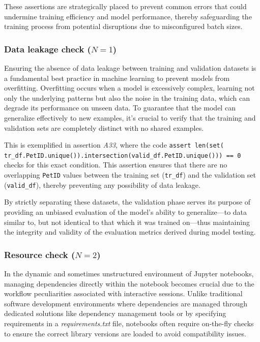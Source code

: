 These assertions are strategically placed to prevent common errors that could undermine training efficiency and model performance, thereby safeguarding the training process from potential disruptions due to misconfigured batch sizes.

\subsubsection{Data leakage check ($N = 1$)}

Ensuring the absence of data leakage between training and validation datasets is a fundamental best practice in machine learning to prevent models from overfitting. Overfitting occurs when a model is excessively complex, learning not only the underlying patterns but also the noise in the training data, which can degrade its performance on unseen data. To guarantee that the model can generalize effectively to new examples, it's crucial to verify that the training and validation sets are completely distinct with no shared examples.

This is exemplified in assertion \emph{A33}, where the code \texttt{assert len(set( tr\_df.PetID.unique()).intersection(valid\_df.PetID.unique())) == 0} checks for this exact condition. This assertion ensures that there are no overlapping \texttt{PetID} values between the training set (\texttt{tr\_df}) and the validation set (\texttt{valid\_df}), thereby preventing any possibility of data leakage.

By strictly separating these datasets, the validation phase serves its purpose of providing an unbiased evaluation of the model's ability to generalize---to data similar to, but not identical to that which it was trained on---thus maintaining the integrity and validity of the evaluation metrics derived during model testing.

\subsubsection{Resource check ($N = 2$)}


In the dynamic and sometimes unstructured environment of Jupyter notebooks, managing dependencies directly within the notebook becomes crucial due to the workflow peculiarities associated with interactive sessions. Unlike traditional software development environments where dependencies are managed through dedicated solutions like dependency management tools or by specifying requirements in a \emph{requirements.txt} file, notebooks often require on-the-fly checks to ensure the correct library versions are loaded to avoid compatibility issues.

